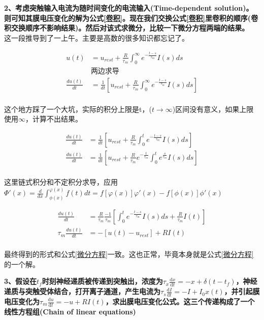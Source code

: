 \documentclass[12pt, a4paper, oneside]{ctexbook}
\begin{document}
\textbf{2、考虑突触输入电流为随时间变化的电流输入(Time-dependent solution)。则可知其膜电压变化的解为公式\ref*{卷积}。现在我们交换公式\ref*{卷积}里卷积的顺序(卷积交换顺序不影响结果)。然后对该式求微分，比较一下微分方程两端的结果。}\\

这一段推导到了一上午。主要是高数的很多知识都忘记了。

\begin{equation}
    \begin{aligned}
        u(t)&=u_{rest}+\frac{R}{\tau_m}\int_0^\infty e^{-\frac{t-s}{\tau_m}}I(s)ds\\
        &\text{两边求导}\\
        \frac{du(t)}{dt}&=\frac{1}{dt}[u_{rest}+\frac{R}{\tau_m}\int_0^\infty e^{-\frac{t-s}{\tau_m}}I(s)ds]\\
    \end{aligned}
\end{equation}

这个地方踩了一个大坑，实际的积分上限是t，($t\to\infty$)区间没有意义，如果上限使用$\infty$，计算不出结果。

\begin{equation}
    \begin{aligned}
        \frac{du(t)}{dt}&=\frac{1}{dt}[u_{rest}+\frac{R}{\tau_m}\int_0^t e^{-\frac{t-s}{\tau_m}}I(s)ds]\\
        \frac{du(t)}{dt}&=\frac{1}{dt}[u_{rest}+\frac{R}{\tau_m}e^{-\frac{t}{\tau_m}}\int_0^t e^{\frac{s}{\tau_m}}I(s)ds]\\
    \end{aligned}
\end{equation}

这里链式积分和不定积分求导，应用$\Phi'(x)=\frac{d}{dx}\int_{\phi(x)}^{\varphi(x)}f(t)dt=f[\varphi(x)]\varphi'(x)-f[\phi(x)]\phi'(x)$

\begin{equation}
    \begin{aligned}
        \frac{du(t)}{dt}&=\frac{R}{\tau_m}\frac{-1}{\tau_m}[\int_0^t e^{-\frac{t-s}{\tau_m}}I(s)ds+\frac{R}{\tau_m}I(t)]\\
        \tau_m\frac{du(t)}{dt}&=-[u(t)-u_{rest}]+RI(t)\\
    \end{aligned}
\end{equation}

最终得到的形式和公式\ref*{微分方程}一致。这也正常，毕竟本身就是公式\ref*{微分方程}的一个解。

\textbf{3、假设在$t_f$时刻神经递质被传递到突触出，浓度为$\tau_x\frac{\text{d}x}{\text{d}t}=-x+\delta(t-t_f)$，神经递质与突触受体结合，打开离子通道，产生电流为$\tau_s\frac{\text{d}I}{\text{d}t}=-I+I_0x(t)$，并引起膜电压变化为$\tau_m\frac{\text{d}u}{\text{d}t}=-u+RI(t)$，求出膜电压变化公式。这三个传递构成了一个线性方程组(Chain of linear equations)}
\end{document}
